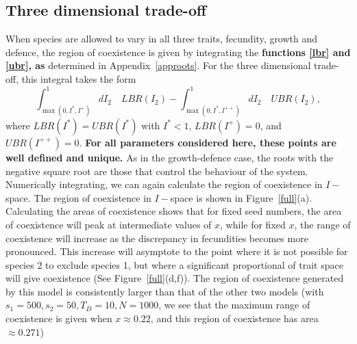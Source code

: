 \subsection{Three dimensional trade-off}
When species are allowed to vary in all three traits, fecundity, growth and defence, the region of coexistence is given by integrating the \textbf{functions \eqref{lbr} and \eqref{ubr}, as} determined in Appendix~\ref{approots}. For the three dimensional trade-off, this integral takes the form
\begin{equation}
\int_{\max(0,I^*,I^+)}^1 dI_2 \quad LBR(I_2) - \int_{\max(0,I^*,I^{++})}^1 dI_2 \quad UBR(I_2),
\end{equation}
where $LBR(I^*)=UBR(I^*)$ with $I^*<1$, $LBR(I^+)=0$, and $UBR(I^{++})=0$. \textbf{For all parameters considered here, these points are well defined and unique.} As in the growth-defence case, the roots with the negative square root are those that control the behaviour of the system. Numerically integrating, we can again calculate the region of coexistence in $I-$space. The region of coexistence in $I-$space is shown in Figure~\ref{full}(a). Calculating the areas of coexistence shows that for fixed seed numbers, the area of coexistence will peak at intermediate values of $x$, while for fixed $x$, the range of coexistence will increase as the discrepancy in fecundities becomes more pronounced. This increase will asymptote to the point where it is not possible for species 2 to exclude species 1, but where a significant proportional of trait space will give coexistence (See Figure~\ref{full}(d,f)). The region of coexistence generated by this model is consistently larger than that of the other two models (with $s_1=500,s_2=50,T_D=10,N=1000$, we see that the maximum range of coexistence is given when $x\approx 0.22$, and this region of coexistence has area $\approx 0.271$)
